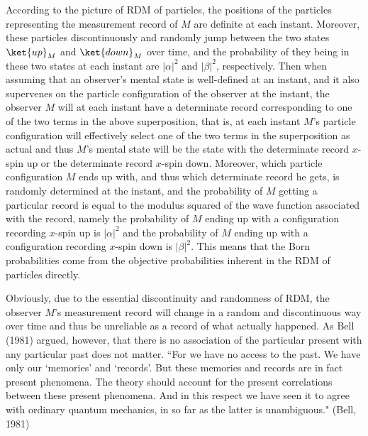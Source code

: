 According to the picture of RDM of particles, the positions of the particles representing the measurement record of $M$ are definite at each instant. Moreover, these particles discontinuously and randomly jump between the two states $\ket{up}_M$ and $\ket{down}_M$ over time, and the probability of they being in these two states at each instant are $|\alpha|^2$ and $|\beta|^2$, respectively.
Then when assuming that an observer's mental state is well-defined at an instant, and it also supervenes on the particle configuration of the observer at the instant,
the observer $M$ will at each instant have a determinate record corresponding to one of the two terms in the above superposition, 
that is, at each instant $M$'s particle configuration will effectively select one of the two terms in the superposition as actual and thus $M$'s mental state will be the state with the determinate record $x$-spin up or the determinate record $x$-spin down.
Moreover, which particle configuration $M$ ends up with, and thus which determinate record he gets, is randomly determined at the instant, and the probability of $M$ getting a particular record is equal to the modulus squared of the wave function associated with the record, namely the probability of $M$ ending up with a configuration recording $x$-spin up is $|\alpha|^2$ and the probability of $M$ ending up with a configuration recording  $x$-spin down is $|\beta|^2$.
This means that the Born probabilities come from the objective probabilities inherent in the RDM of particles directly.

Obviously, due to the essential discontinuity and randomness of RDM, the observer $M$'s measurement record will change in a random and discontinuous way over time and thus be unreliable as a record of what actually happened.
As Bell (1981) argued, however, that there is no association of the particular present with any particular past does not matter. ``For we have no access to the past. We have only our `memories' and 
`records'. But these memories and records are in fact present phenomena. The theory should account for the present correlations between these present phenomena. And in this respect we have seen it to agree with ordinary quantum mechanics, in so far as the latter is unambiguous." (Bell, 1981)

